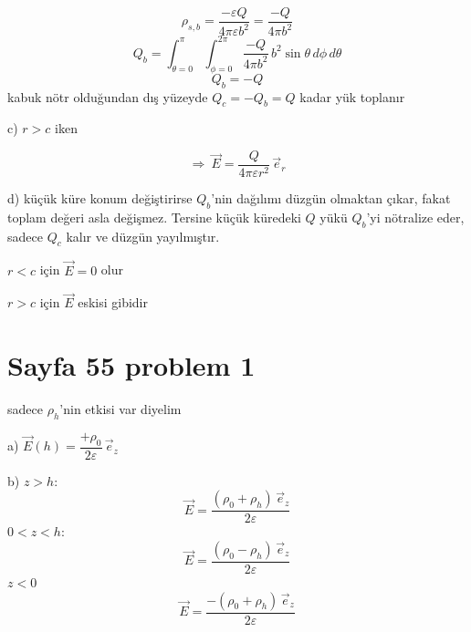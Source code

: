 \documentclass[11pt,a4paper]{article}
\begin{document}
\[
\rho_{s,b}=\frac{-\varepsilon Q}{4\pi\varepsilon b^{2}}=\frac{-Q}{4\pi b^{2}}
\]
\[
Q_b=\int_{\theta=0}^{\pi}\int_{\phi=0}^{2\pi}\frac{-Q}{4\pi b^{2}}\,b^{2}\sin\theta\,d\phi\,d\theta
\]
\[
Q_b=-Q
\]
kabuk nötr olduğundan dış yüzeyde $Q_c=-Q_b=Q$ kadar yük toplanır

c) $r>c$ iken
\begin{center}
\end{center}
\[
\Rightarrow\ \vec E=\frac{Q}{4\pi\varepsilon r^{2}}\,\vec e_r
\]

d) küçük küre konum değiştirirse $Q_b$'nin dağılımı düzgün olmaktan çıkar, fakat toplam değeri asla değişmez. Tersine küçük küredeki $Q$ yükü $Q_b$'yi nötralize eder, sadece $Q_c$ kalır ve düzgün yayılmıştır.

$r<c$ için $\vec E=0$ olur

$r>c$ için $\vec E$ eskisi gibidir


\section{Sayfa 55 problem 1}
\begin{center}
\end{center}

sadece $\rho_h$'nin etkisi var diyelim

a) \qquad $\vec E(h)=\dfrac{+\rho_0}{2\varepsilon}\,\vec e_z$

b) $z>h$:
\[
\vec E=\frac{(\rho_0+\rho_h)\,\vec e_z}{2\varepsilon}
\]
$0<z<h$:
\[
\vec E=\frac{(\rho_0-\rho_h)\,\vec e_z}{2\varepsilon}
\]
$z<0$
\[
\vec E=\frac{-(\rho_0+\rho_h)\,\vec e_z}{2\varepsilon}
\]
\end{document}
